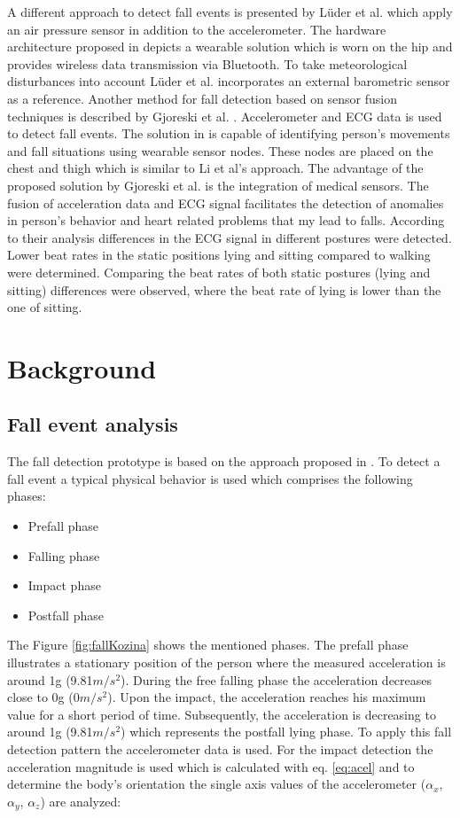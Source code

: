 \documentclass[10pt,journal,compsoc]{IEEEtran}
\begin{document}
A different approach to detect fall events is presented by Lüder et al. \cite{Luder2009} which apply an air pressure sensor in addition to the accelerometer. The hardware architecture proposed in \cite{Luder2009} depicts a wearable solution which is worn on the hip and provides wireless data transmission via Bluetooth. To take meteorological disturbances into account Lüder et al. \cite{Luder2009} incorporates an external barometric sensor as a reference. Another method for fall detection based on sensor fusion techniques is described by Gjoreski et al. \cite{Gjoreski2014}. Accelerometer and ECG data is used to detect fall events. The solution in \cite{Gjoreski2014} is capable of identifying person's movements and fall situations using wearable sensor nodes. These nodes are placed on the chest and thigh which is similar to Li et al's \cite{Li2009} approach. The advantage of the proposed solution by Gjoreski et al. \cite{Gjoreski2014} is the integration of medical sensors. The fusion of acceleration data and ECG signal facilitates the detection of anomalies in person's behavior and heart related problems that my lead to falls. According to their analysis differences in the ECG signal in different postures were detected. Lower beat rates in the static positions lying and sitting compared to walking were determined. Comparing the beat rates of both static postures (lying and sitting) differences were observed, where the beat rate of lying is lower than the one of sitting.

\section{Background}
\label{sec:background}

\subsection{Fall event analysis}
\label{subsec:fall-analysis}
The fall detection prototype is based on the approach proposed in \cite{Gjoreski2014, Kozina}. To detect a fall event a typical physical behavior is used which comprises the following phases:
\begin{itemize}
	\item Prefall phase 
	\item Falling phase
	\item Impact phase
	\item Postfall phase
\end{itemize}
The Figure \ref{fig:fallKozina} shows the mentioned phases. The prefall phase illustrates a stationary position of the person where the measured acceleration is around 1g (9.81$m/s^{2}$). During the free falling phase the  acceleration decreases close to 0g (0$m/s^{2}$). Upon the impact, the acceleration reaches his maximum value for a short period of time. Subsequently, the acceleration is decreasing to around 1g (9.81$m/s^{2}$) which represents the postfall lying phase. To apply this fall detection pattern the accelerometer data is used. For the impact detection the acceleration magnitude is used which is calculated with eq. \ref{eq:acel} and to determine the body's orientation the single axis values of the accelerometer ($\alpha_x$, $\alpha_y$, $\alpha_z$) are analyzed:
\end{document}

